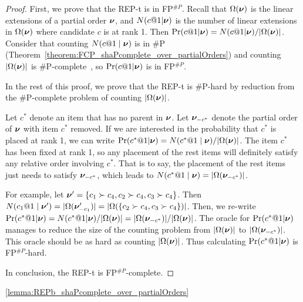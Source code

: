 \begin{proof}
    First, we prove that the REP-t is in FP$^{\#P}$.
    Recall that $\Omega(\bm{\nu})$ is the linear extensions of a partial order $\bm{\nu}$, and $N(c@1 {\mid} \bm{\nu})$ is the number of linear extensions in $\Omega(\bm{\nu})$ where candidate $c$ is at rank 1.
    Then $\Pr(c@1 {\mid} \bm{\nu}) = N(c@1 {\mid} \bm{\nu}) / |\Omega(\bm{\nu})|$.
    Consider that counting $N(c@1 \mid \bm{\nu})$ is in \#P (Theorem~\ref{theorem:FCP_shaPcomplete_over_partialOrders}) and counting $|\Omega(\bm{\nu})|$ is \#P-complete~\cite{DBLP:conf/stoc/BrightwellW91}, so $\Pr(c@1 {\mid} \bm{\nu})$ is in FP$^{\#P}$.
    
    In the rest of this proof, we prove that the REP-t is \#P-hard by reduction from the \#P-complete problem of counting $|\Omega(\bm{\nu})|$.
    
    Let $c^*$ denote an item that has no parent in $\bm{\nu}$.
    Let $\bm{\nu}_{-c^*}$ denote the partial order of $\bm{\nu}$ with item $c^*$ removed.
    If we are interested in the probability that $c^*$ is placed at rank 1, we can write $\Pr(c^*@1 {\mid} \bm{\nu}) = N(c^*@1 \mid \bm{\nu}) / |\Omega(\bm{\nu})|$.
    The item $c^*$ has been fixed at rank 1, so any placement of the rest items will definitely satisfy any relative order involving $c^*$.
    That is to say, the placement of the rest items just needs to satisfy $\bm{\nu}_{-c^*}$, which leads to $N(c^*@1 \mid \bm{\nu}) = |\Omega(\bm{\nu}_{-c^*})|$.
    
    For example, let $\bm{\nu}' = \{ c_1 \succ c_4, c_2 \succ c_4, c_3 \succ c_4 \}$.   Then $N(c_1@1 \mid \bm{\nu}') = |\Omega(\bm{\nu}'_{-c_1})| = |\Omega(\{ c_2 \succ c_4, c_3 \succ c_4 \})|$.
    Then, we re-write $\Pr(c^*@1 {\mid} \bm{\nu}) = N(c^*@1 {\mid} \bm{\nu}) / |\Omega(\bm{\nu})| = |\Omega(\bm{\nu}_{-c^*})| / |\Omega(\bm{\nu})|$.
    The oracle for $\Pr(c^*@1 {\mid} \bm{\nu})$ manages to reduce the size of the counting problem from $|\Omega(\bm{\nu})|$ to $|\Omega(\bm{\nu}_{-c^*})|$.
    This oracle should be as hard as counting $|\Omega(\bm{\nu})|$.
    Thus calculating $\Pr(c^*@1 {\mid} \bm{\nu})$ is FP$^{\#P}$-hard.
    
    In conclusion, the REP-t is FP$^{\#P}$-complete.
\end{proof}

\begin{replemma}{\ref{lemma:REPb_shaPcomplete_over_partialOrders}}
    \lemmaREPbHardnessOverPartialOrders
\end{replemma}

